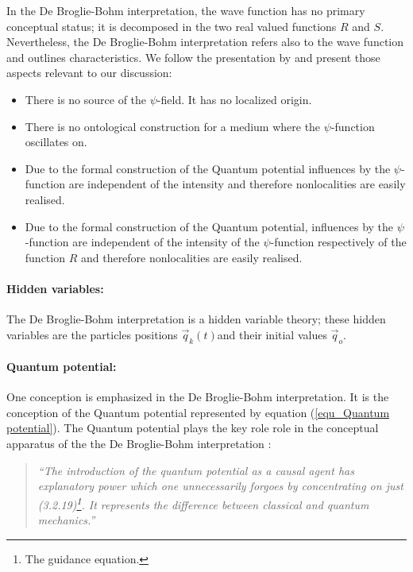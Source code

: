 \documentclass{article}
\begin{document}
In the De Broglie-Bohm interpretation, the wave function has no primary conceptual status; it is decomposed in the two real valued functions $R$ and $S$. Nevertheless, the De Broglie-Bohm interpretation refers also to the wave function and outlines characteristics. We follow the presentation by \cite[p.83-84]{holland1995quantum} and present those aspects relevant to our discussion:

\begin{itemize}
\item
There is no source of the $\psi$-field. It has no localized origin.

\item
There is no ontological construction for a medium where the $\psi$-function oscillates on. 

\item
Due to the formal construction of the Quantum potential influences by the $\psi$-function are independent of the intensity and therefore nonlocalities are easily realised.

\item
Due to the formal construction of the Quantum potential, influences by the $\psi$-function are independent of the intensity of the $\psi$-function respectively of the function $R$ and therefore nonlocalities are easily realised.

\end{itemize}


\paragraph{Hidden variables:}

The De Broglie-Bohm interpretation is a hidden variable theory; these hidden variables are the particles positions $\vec q_k(t)$and their initial values $\vec q_o$.  

\paragraph{Quantum potential:}

One conception is emphasized in the De Broglie-Bohm interpretation. It is the conception of the Quantum potential represented by equation (\ref{equ_Quantum potential}). The Quantum potential plays the key role role in the conceptual apparatus of the the De Broglie-Bohm interpretation \cite[p.78]{holland1995quantum}:

\begin{quote}
\textit{``The introduction of the quantum potential as a causal agent has explanatory power which one unnecessarily forgoes by concentrating on just (3.2.19)\footnote{The guidance equation.}. It represents the difference between classical and quantum mechanics.''}
\end{quote}
\end{document}
